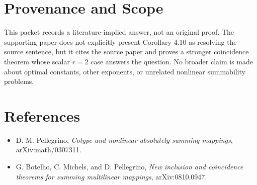 \documentclass[11pt]{article}
\begin{document}
\section*{Provenance and Scope}

This packet records a literature-implied answer, not an original proof.  The
supporting paper does not explicitly present Corollary 4.10 as resolving the
source sentence, but it cites the source paper and proves a stronger
coincidence theorem whose scalar \(r=2\) case answers the question.  No broader
claim is made about optimal constants, other exponents, or unrelated nonlinear
summability problems.

\section*{References}

\begin{itemize}
\item D. M. Pellegrino, \emph{Cotype and nonlinear absolutely summing
mappings}, arXiv:math/0307311.
\item G. Botelho, C. Michels, and D. Pellegrino, \emph{New inclusion and
coincidence theorems for summing multilinear mappings}, arXiv:0810.0947.
\end{itemize}
\end{document}
